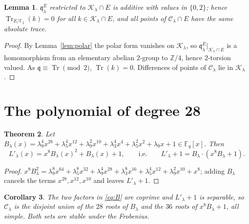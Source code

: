 \documentclass[12pt,a4paper]{amsart}
\newtheorem{theorem}{Theorem}[section]
\newtheorem{lemma}[theorem]{Lemma}
\newtheorem{corollary}[theorem]{Corollary}
\theoremstyle{definition}
\newcommand{\F}{\mathbb{F}}
\newcommand{\Z}{\mathbb{Z}}
\newcommand{\Tr}{\operatorname{Tr}}
\newcommand{\Kk}{\mathcal{K}}
\newcommand{\Cc}{\mathcal{C}}
\newcommand{\qq}{\mathfrak{q}}
\newcommand{\Fq}{\F_{q}}
\begin{document}
\begin{lemma}\label{lem:trace0}
$\qq^E_\lambda$ restricted to $\Kk_\lambda\cap E$ is additive with values in $\{0,2\}$; hence $\Tr_{E/\F_2}(k)=0$ for all $k\in\Kk_\lambda\cap E$, and all points of $\Cc_\lambda\cap E$ have the same absolute trace.
\end{lemma}
\begin{proof}
By Lemma~\ref{lem:polar} the polar form vanishes on $\Kk_\lambda$, so $\qq^E_\lambda|_{\Kk_\lambda\cap E}$ is a homomorphism from an elementary abelian $2$-group to $\Z/4$, hence $2$-torsion valued. As $\qq\equiv\Tr\pmod 2$, $\Tr(k)=0$. Differences of points of $\Cc_\lambda$ lie in $\Kk_\lambda$.
\end{proof}

\section{The polynomial of degree 28}\label{sec:B}

\begin{theorem}\label{thm:B}
Let $B_\lambda(x)=\lambda_9^4x^{28}+\lambda_5^4x^{12}+\lambda_9^2x^{10}+\lambda_3^4x^4+\lambda_5^2x^2+\lambda_9x+1\in\Fq[x]$. Then
\begin{equation}\label{eq:B}
L'_\lambda(x)=x^8B_\lambda(x)^2+B_\lambda(x)+1,\qquad\text{i.e.}\qquad L'_\lambda+1=B_\lambda\cdot(x^8B_\lambda+1).
\end{equation}
\end{theorem}
\begin{proof}
$x^8B_\lambda^2=\lambda_9^8x^{64}+\lambda_5^8x^{32}+\lambda_9^4x^{28}+\lambda_3^8x^{16}+\lambda_5^4x^{12}+\lambda_9^2x^{10}+x^8$; adding $B_\lambda$ cancels the terms $x^{28},x^{12},x^{10}$ and leaves $L'_\lambda+1$.
\end{proof}

\begin{corollary}\label{cor:split}
The two factors in \eqref{eq:B} are coprime and $L'_\lambda+1$ is separable, so $\Cc_\lambda$ is the disjoint union of the $28$ roots of $B_\lambda$ and the $36$ roots of $x^8B_\lambda+1$, all simple. Both sets are stable under the Frobenius.
\end{corollary}
\end{document}
